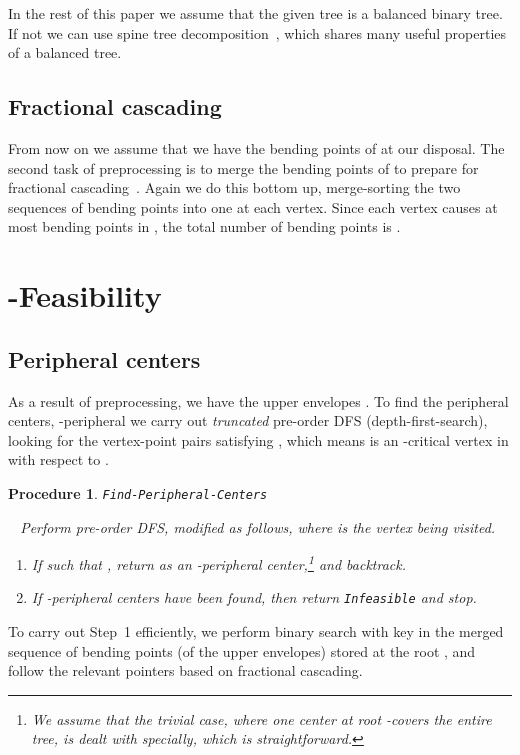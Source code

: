 \documentclass{llncs}
\newtheorem{procedure}{Procedure}
\newcommand{\QED}{\hfill}
\begin{document}
{In the rest of this paper we assume that the given tree  is a balanced binary tree.
If not we can use spine tree decomposition~\cite{benkoczi2004,benkoczi2003,bhattacharya2012b},
which shares many useful properties of a balanced tree.



\subsection{Fractional cascading}\label{sec:fractional}

From now on we assume that we have the bending points of
 at our disposal.
The second task of preprocessing is to merge the bending points of 
to prepare for fractional cascading~\cite{chazelle1986a}.
Again we do this bottom up, 
merge-sorting the two sequences of bending points into one at each vertex.
Since each vertex causes at most  bending points in ,
the total number of bending points is .


\section{-Feasibility}\label{sec:feasibility}

\subsection{Peripheral centers}\label{sec:Pctrs}
As a result of preprocessing,
we have the upper envelopes .
To find the peripheral centers, -peripheral 
we carry out {\em truncated} pre-order DFS (depth-first-search),
looking for the vertex-point pairs  satisfying ,
which means  is an -critical vertex in  with respect to .

\begin{procedure}{\tt Find-Peripheral-Centers}\label{proc:findPC}

~\noindent
Perform pre-order DFS, modified as follows,
where  is the vertex being visited.
\begin{enumerate}
\item
If  such that ,
return  as an -peripheral center,\footnote{We assume that the trivial case,
where one center at root  -covers the entire tree, is dealt with specially,
which is straightforward. 
}
and backtrack.
\item
If  -peripheral centers have been found, then return {\tt Infeasible} and stop.
\QED
\end{enumerate}
\end{procedure}
To carry out Step~1 efficiently,
we perform binary search with key  in the merged sequence
of bending points (of the upper envelopes) stored at the root ,
and follow the relevant pointers based on fractional cascading.

}
\end{document}
